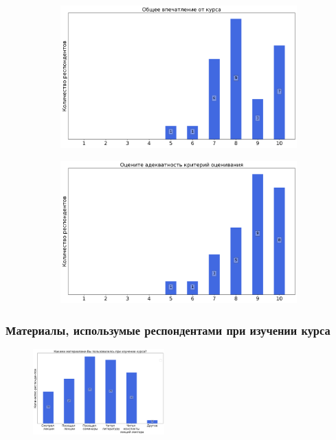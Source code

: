 		\begin{figure}[H]
			\centering
			\begin{subfigure}[b]{0.45\textwidth}
				\centering
				\includegraphics[width=\textwidth]{images/2 course/Кратные интегралы и теория поля/general-0.png}
			\end{subfigure}
			\begin{subfigure}[b]{0.45\textwidth}
				\centering
				\includegraphics[width=\textwidth]{images/2 course/Кратные интегралы и теория поля/general-1.png}
			\end{subfigure}	
		\end{figure}

	\subsubsection{Материалы, использумые респондентами при изучении курса}

		\begin{figure}[H]
			\centering
			\includegraphics[width = 0.45\textwidth]{images/2 course/Кратные интегралы и теория поля/materials.png}
		\end{figure}

